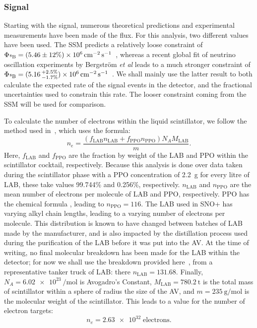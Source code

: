 \subsubsection{\beight{} Signal}
Starting with the \beight{} signal, numerous theoretical predictions and experimental measurements have been made of the \beight{} flux. For this analysis, two different values have been used. The SSM predicts a relatively loose constraint of $\Phi_{\beight{}} = (5.46\pm 12\%)\times 10^{6}\,\si{\per\cm\squared\per\second}$~\cite{vinyolesB16StandardSolar2018}, %
whereas a recent global fit of neutrino oscillation experiments by Bergstr\"{o}m \textit{et al} leads to a much stronger constraint of $\Phi_{\beight{}} = (5.16\,^{+2.5\%}_{-1.7\%})\times 10^{6}\,\si{\per\cm\squared\per\second}$~\cite{bergstromUpdatedDeterminationSolar2016}. %
We shall mainly use the latter result to both calculate the expected rate of the signal events in the detector, and the fractional uncertainties used to constrain this rate. The looser constraint coming from the SSM will be used for comparison.

To calculate the number of electrons within the liquid scintillator, we follow the method used in~\cite{inacioDataAnalysisWater2022}, %
which uses the formula:
\begin{equation}
    n_{e} = \frac{\left(f_{\mathrm{LAB}}n_{\mathrm{LAB}} +
                        f_{\mathrm{PPO}}n_{\mathrm{PPO}}\right)
                  N_{A}M_{\mathrm{LAB}}}
                 {m}.
\end{equation}
Here, $f_{\mathrm{LAB}}$ and $f_{\mathrm{PPO}}$ are the fraction by weight of the LAB and PPO within the scintillator cocktail, respectively. Because this analysis is done over data taken during the scintillator phase with a PPO concentration of \SI{2.2}{\g} for every litre of LAB, these take values 99.744\% and 0.256\%, respectively. $n_{\mathrm{LAB}}$ and $n_{\mathrm{PPO}}$ are the mean number of electrons per molecule of LAB and PPO, respectively. PPO has the chemical formula , leading to $n_{\mathrm{PPO}} = 116$. The LAB used in SNO+ has varying alkyl chain lengths, leading to a varying number of electrons per molecule. This distribution is known to have changed between batches of LAB made by the manufacturer, and is also impacted by the distillation process used during the purification of the LAB before it was put into the AV. At the time of writing, no final molecular breakdown has been made for the LAB within the detector; for now we shall use the breakdown provided here~\cite{lebeufLABCertificateAnalysis2020}, %
from a representative tanker truck of LAB: there $n_{\mathrm{LAB}} = 131.68$. Finally, $N_{A} = \SI{6.02e23}{\per\mol}$ is Avogadro's Constant, $M_{\mathrm{LAB}} = \SI{780.2}{\tonne}$ is the total mass of scintillator within a sphere of radius the size of the AV, and $m = \SI{235}{\g\per\mol}$ is the molecular weight of the scintillator. This leads to a value for the number of electron targets:
\begin{equation*}
    n_{e} = \num{2.63e32}\; \mathrm{electrons}.
\end{equation*}

